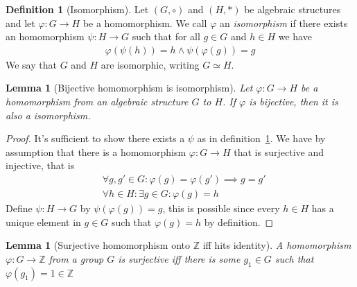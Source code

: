 \documentclass{article}
\theoremstyle{plain}
\newtheorem{lemma}[theorem]{Lemma}
\theoremstyle{definition}
\newtheorem{definition}[theorem]{Definition}
\newcommand{\Z}{\mathbb{Z}}
\begin{document}
\begin{definition}[Isomorphism]\label{Isomorphism}
Let $(G,\circ)$ and $(H,*)$ be algebraic structures and let
$\varphi:G\rightarrow H$ be a homomorphism. We call $\varphi$ an
\textit{isomorphism} if there exists an homomorphism $\psi : H\rightarrow G$
such that for all $g\in G$ and $h\in H$ we have
\begin{equation}
\begin{aligned}
	\varphi(\psi(h))=h\land \psi(\varphi(g))=g
\end{aligned}
\end{equation}
We say that $G$ and $H$ are isomorphic, writing $G\simeq H$.
\end{definition}
\begin{lemma}[Bijective homomorphism is isomorphism]\label{Bijective homomorphism is isomorphism}
	Let $\varphi:G\rightarrow H$ be a homomorphism from an algebraic structure
	$G$ to $H$. If $\varphi$ is bijective, then it is also a isomorphism.
\end{lemma}
\begin{proof}
	It's sufficient to show there exists a $\psi$ as in
	definition~\ref{Isomorphism}. We have by assumption that there is a
	homomorphism $\varphi:G\rightarrow H$ that is surjective and injective, that
	is
	\begin{equation}
	\begin{aligned}
		&\forall g,g'\in G: \varphi(g)=\varphi(g')\implies g=g'\\
		&\forall h\in H:\exists g\in G: \varphi(g)=h
	\end{aligned}
	\end{equation}
	Define $\psi:H\rightarrow G$ by $\psi(\varphi(g))=g$, this is possible since
	every $h\in H$ has a unique element in $g\in G$ such that $\varphi(g)=h$ by
	definition.
\end{proof}
\begin{lemma}[Surjective homomorphism onto $\Z$ iff hits
	identity]\label{surjective homomorphism condition}
	A homomorphism $\varphi:G\rightarrow \Z$ from a group $G$ is
	surjective iff there is some $g_1\in G$ such that $\varphi(g_1)=1\in\Z$
\end{lemma}
\end{document}
